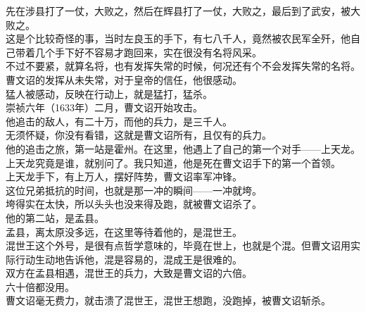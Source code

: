 \begin{multicols}{\theparacolNo}
先在涉县打了一仗，大败之，然后在辉县打了一仗，大败之，最后到了武安，被大败之。\\

这是个比较奇怪的事，当时左良玉的手下，有七八千人，竟然被农民军全歼，他自己带着几个手下好不容易才跑回来，实在很没有名将风采。\\

不过不要紧，就算名将，也有发挥失常的时候，何况还有个不会发挥失常的名将。\\

曹文诏的发挥从未失常，对于皇帝的信任，他很感动。\\

猛人被感动，反映在行动上，就是猛打，猛杀。\\

崇祯六年（1633年）二月，曹文诏开始攻击。\\

他追击的敌人，有二十万，而他的兵力，是三千人。\\

无须怀疑，你没有看错，这就是曹文诏所有，且仅有的兵力。\\

他的追击之旅，第一站是霍州。在这里，他遇上了自己的第一个对手——上天龙。\\

上天龙究竟是谁，就别问了。我只知道，他是死在曹文诏手下的第一个首领。\\

上天龙手下，有上万人，摆好阵势，曹文诏率军冲锋。\\

这位兄弟抵抗的时间，也就是那一冲的瞬间——一冲就垮。\\

垮得实在太快，所以头头也没来得及跑，就被曹文诏杀了。\\

他的第二站，是孟县。\\

孟县，离太原没多远，在这里等待着他的，是混世王。\\

混世王这个外号，是很有点哲学意味的，毕竟在世上，也就是个混。但曹文诏用实际行动生动地告诉他，混是容易的，混成王是很难的。\\

双方在孟县相遇，混世王的兵力，大致是曹文诏的六倍。\\

六十倍都没用。\\

曹文诏毫无费力，就击溃了混世王，混世王想跑，没跑掉，被曹文诏斩杀。\\


\end{multicols}
